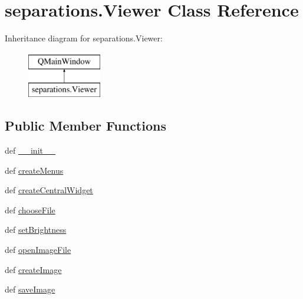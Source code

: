 \hypertarget{classseparations_1_1Viewer}{}\section{separations.\+Viewer Class Reference}
\label{classseparations_1_1Viewer}
Inheritance diagram for separations.\+Viewer\+:\begin{figure}[H]
\begin{center}
\leavevmode
\includegraphics[height=2.000000cm]{classseparations_1_1Viewer}
\end{center}
\end{figure}
\subsection*{Public Member Functions}
\begin{DoxyCompactItemize}
\item 
def \hyperlink{classseparations_1_1Viewer_aa7698142b7c818670df99ff8cbc61535}{\+\_\+\+\_\+init\+\_\+\+\_\+}
\item 
def \hyperlink{classseparations_1_1Viewer_a5b0509d8b7e84633c0a3ccb322a10bd4}{create\+Menus}
\item 
def \hyperlink{classseparations_1_1Viewer_a28cc125cacdb85becfeb41793083663b}{create\+Central\+Widget}
\item 
def \hyperlink{classseparations_1_1Viewer_a669d86a80d7f9c57022a6a50a93a2e12}{choose\+File}
\item 
def \hyperlink{classseparations_1_1Viewer_af1004d4902d9fa4a66baf075f1a4519b}{set\+Brightness}
\item 
def \hyperlink{classseparations_1_1Viewer_ad4cb155a71d4ec4f2eeaa46c1dd0332a}{open\+Image\+File}
\item 
def \hyperlink{classseparations_1_1Viewer_a492387102d1a992b2c5acf87327a2454}{create\+Image}
\item 
def \hyperlink{classseparations_1_1Viewer_ad44d8d3fa9acfcc2eeddf72de24fc99f}{save\+Image}
\end{DoxyCompactItemize}
